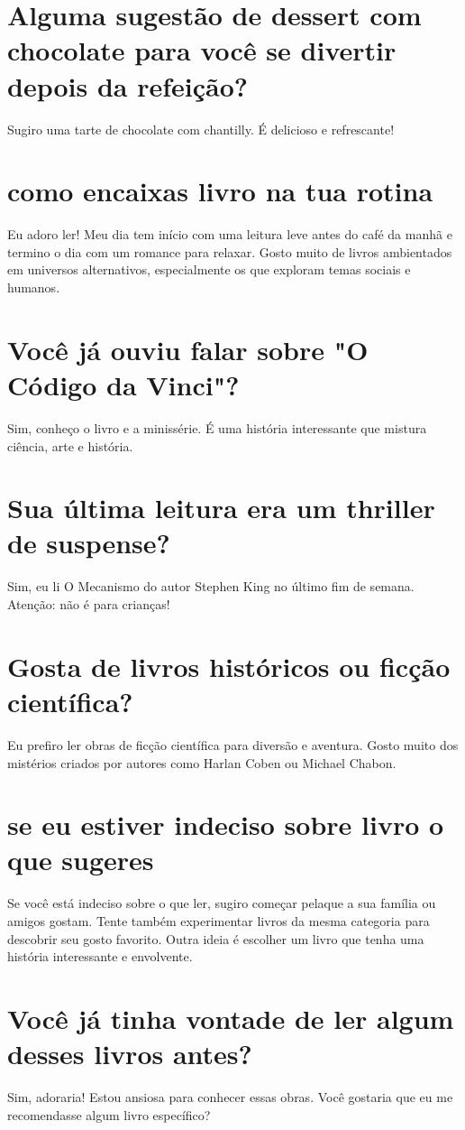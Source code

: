 \documentclass[11pt,a4paper]{article}
\begin{document}
\section{Alguma sugestão de dessert com chocolate para você se divertir depois da refeição?}
Sugiro uma tarte de chocolate com chantilly. É delicioso e refrescante!

\section{como encaixas livro na tua rotina}
Eu adoro ler! Meu dia tem início com uma leitura leve antes do café da manhã e termino o dia com um romance para relaxar. Gosto muito de livros ambientados em universos alternativos, especialmente os que exploram temas sociais e humanos.

\section{Você já ouviu falar sobre "O Código da Vinci"?}
Sim, conheço o livro e a minissérie. É uma história interessante que mistura ciência, arte e história.

\section{Sua última leitura era um thriller de suspense?}
Sim, eu li O Mecanismo do autor Stephen King no último fim de semana. Atenção: não é para crianças!

\section{Gosta de livros históricos ou ficção científica?}
Eu prefiro ler obras de ficção científica para diversão e aventura. Gosto muito dos mistérios criados por autores como Harlan Coben ou Michael Chabon.

\section{se eu estiver indeciso sobre livro o que sugeres}
Se você está indeciso sobre o que ler, sugiro começar pelaque a sua família ou amigos gostam. Tente também experimentar livros da mesma categoria para descobrir seu gosto favorito. Outra ideia é escolher um livro que tenha uma história interessante e envolvente.

\section{Você já tinha vontade de ler algum desses livros antes?}
Sim, adoraria! Estou ansiosa para conhecer essas obras. Você gostaria que eu me recomendasse algum livro específico?
\end{document}
